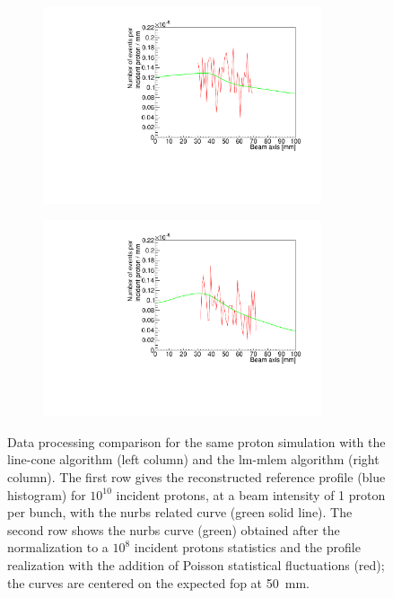 \begin{figure}
\begin{subfigure}[b]{.5\textwidth}
\includegraphics[width=0.9\textwidth]{03_GraphicFiles/chapter4_HTsimu/Results_forHadronthPaper/profile_Poisson_lineCone_green.pdf}
\caption{}
\label{chap4::fig::fig_Estimation_Camera_CC_NURBS_Poisson_LC}
\end{subfigure}
\begin{subfigure}[b]{.5\textwidth}
\centering
\includegraphics[width=0.9\textwidth]{03_GraphicFiles/chapter4_HTsimu/Results_forHadronthPaper/profile_Poisson_MLEM_green.pdf}
\caption{}
\label{chap4::fig::fig_Estimation_Camera_CC_NURBS_Poisson_MLEM}
\end{subfigure}
 \caption{Data processing comparison for the same proton simulation with the line-cone algorithm (left column) and the \gls{lm-mlem} algorithm (right column). The first row gives the reconstructed reference profile (blue histogram) for $10^{10}$ incident protons, at a beam intensity of 1 proton per bunch, with the \gls{nurbs} related curve (green solid line). The second row shows the \gls{nurbs} curve (green) obtained after the normalization to a $10^8$ incident protons statistics and the profile realization with the addition of Poisson statistical fluctuations (red); the curves are centered on the expected \gls{fop} at 50~mm. }
\end{figure}

